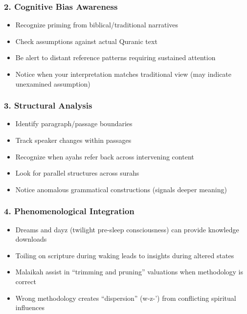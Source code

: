 \documentclass[12pt,a4paper]{article}
\providecommand{\tightlist}{\setlength{\itemsep}{0pt}\setlength{\parskip}{0pt}}
\begin{document}
\subsubsection{2. Cognitive Bias
Awareness}\label{cognitive-bias-awareness}

\begin{itemize}
\tightlist
\item
  Recognize priming from biblical/traditional narratives
\item
  Check assumptions against actual Quranic text
\item
  Be alert to distant reference patterns requiring sustained attention
\item
  Notice when your interpretation matches traditional view (may indicate
  unexamined assumption)
\end{itemize}

\subsubsection{3. Structural Analysis}\label{structural-analysis}

\begin{itemize}
\tightlist
\item
  Identify paragraph/passage boundaries
\item
  Track speaker changes within passages
\item
  Recognize when ayahs refer back across intervening content
\item
  Look for parallel structures across surahs
\item
  Notice anomalous grammatical constructions (signals deeper meaning)
\end{itemize}

\subsubsection{4. Phenomenological
Integration}\label{phenomenological-integration}

\begin{itemize}
\tightlist
\item
  Dreams and dayz (twilight pre-sleep consciousness) can provide
  knowledge downloads
\item
  Toiling on scripture during waking leads to insights during altered
  states
\item
  Malaikah assist in ``trimming and pruning'' valuations when
  methodology is correct
\item
  Wrong methodology creates ``dispersion'' (w-z-') from conflicting
  spiritual influences
\end{itemize}
\end{document}
